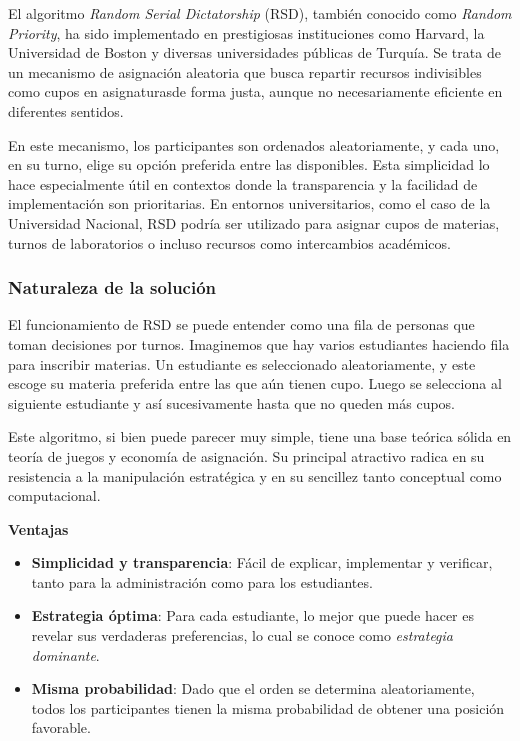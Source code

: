 \documentclass{article}
\begin{document}
El algoritmo \textit{Random Serial Dictatorship} (RSD), también conocido como 
\textit{Random Priority}, ha sido implementado en prestigiosas 
instituciones como Harvard, la Universidad de Boston y diversas 
universidades públicas de Turquía. Se trata de un mecanismo de asignación 
aleatoria que busca repartir recursos indivisibles como cupos en asignaturasde 
forma justa, aunque no necesariamente eficiente en diferentes sentidos.

En este mecanismo, los participantes son ordenados aleatoriamente, y cada uno, en su 
turno, elige su opción preferida entre las disponibles. Esta simplicidad lo hace 
especialmente útil en contextos donde la transparencia y la facilidad de implementación 
son prioritarias. En entornos universitarios, como el caso de la Universidad Nacional, 
RSD podría ser utilizado para asignar cupos de materias, turnos de laboratorios o 
incluso recursos como intercambios académicos.

\subsubsection{Naturaleza de la solución}

El funcionamiento de RSD se puede entender como una fila de personas que toman decisiones 
por turnos. Imaginemos que hay varios estudiantes haciendo fila para inscribir materias. 
Un estudiante es seleccionado aleatoriamente, y este escoge su materia preferida entre 
las que aún tienen cupo. Luego se selecciona al siguiente estudiante y así sucesivamente 
hasta que no queden más cupos.

Este algoritmo, si bien puede parecer muy simple, tiene una base teórica sólida en teoría de juegos y economía de asignación. Su principal atractivo radica en su resistencia a la manipulación estratégica y en su sencillez tanto conceptual como computacional.

\textbf{Ventajas}
\begin{itemize}
    \item \textbf{Simplicidad y transparencia}: Fácil de explicar, implementar y verificar, tanto para la administración como para los estudiantes.
    \item \textbf{Estrategia óptima}: Para cada estudiante, lo mejor que puede hacer es revelar sus verdaderas preferencias, lo cual se conoce como \textit{estrategia dominante}.
    \item \textbf{Misma probabilidad}: Dado que el orden se determina aleatoriamente, todos los participantes tienen la misma probabilidad de obtener una posición favorable.
\end{itemize}
\end{document}

